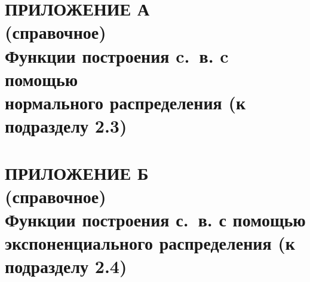 \renewcommand{\thefigure}{\Asbuk{section}.\arabic{figure}}
\renewcommand{\thetable}{\Asbuk{section}.\arabic{table}}
\renewcommand{\thelstlisting}{\Asbuk{section}.\arabic{lstlisting}}

\pagestyle{fancy}
\fancyhf{} %
\fancyfoot[R]{\thepage}
\renewcommand{\headrulewidth}{0pt}
\renewcommand{\footrulewidth}{0pt}

\setlength{\headheight}{10mm}
\setlength{\headsep}{\baselineskip}

\section*{ПРИЛОЖЕНИЕ А\\(справочное)\\Функции построения c.~в. c помощью \\
нормального распределения (к подразделу 2.3)}

\thispagestyle{plain}
\setcounter{section}{1}
\setcounter{figure}{0}
\setcounter{table}{0}
\setcounter{lstlisting}{0}





\setlength{\headheight}{10mm}
\setlength{\headsep}{\baselineskip}
\section*{ПРИЛОЖЕНИЕ Б\\(справочное)\\Функции построения с.~в. с помощью \\
экспоненциального распределения (к подразделу 2.4)}

\thispagestyle{plain}
\setcounter{section}{2}
\setcounter{figure}{0}
\setcounter{table}{0}
\setcounter{lstlisting}{0}


